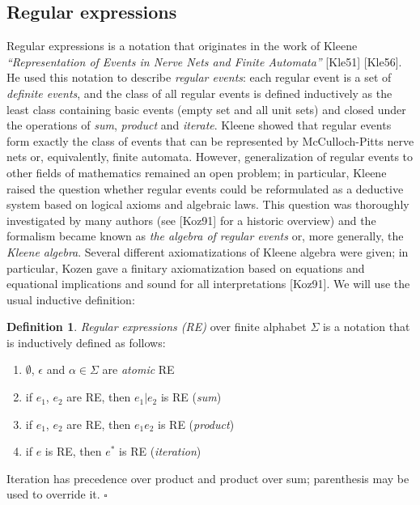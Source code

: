 \documentclass{article}
\newcommand{\Xin}{\!\in\!}
\newcommand{\Xeq}{\!=\!}
\theoremstyle{definition}
\newtheorem{Xdef}{Definition}
\begin{document}
\begin{multicols}{2}
\section{Regular expressions}\label{section_regular_expressions}

Regular expressions is a notation that originates in the work of Kleene
\emph{``Representation of Events in Nerve Nets and Finite Automata''} [Kle51] [Kle56].
He used this notation to describe \emph{regular events}:
each regular event is a set of \emph{definite events},
and the class of all regular events is defined inductively
as the least class containing basic events (empty set and all unit sets)
and closed under the operations of \emph{sum}, \emph{product} and \emph{iterate}.
Kleene showed that regular events form exactly the class of events that can be represented by McCulloch-Pitts nerve nets or, equivalently, finite automata.
However, generalization of regular events to other fields of mathematics remained an open problem;
in particular, Kleene raised the question whether regular events could be reformulated
as a deductive system based on logical axioms and algebraic laws.
This question was thoroughly investigated by many authors (see [Koz91] for a historic overview)
and the formalism became known as \emph{the algebra of regular events} %
or, more generally, the \emph{Kleene algebra}.
Several different axiomatizations of Kleene algebra were given;
in particular, Kozen gave a finitary axiomatization based on equations and equational implications and sound for all interpretations [Koz91].
We will use the usual inductive definition:
\\

    \begin{Xdef}
    \emph{Regular expressions (RE)} over finite alphabet $\Sigma$
    is a notation that is inductively defined as follows:
    \begin{enumerate}
        \medskip
        \item[] $\emptyset$, $\epsilon$ and $\alpha \Xin \Sigma$ are \emph{atomic} RE
        \item[] if $e_1$, $e_2$ are RE, then $e_1 | e_2$ is RE (\emph{sum})
        \item[] if $e_1$, $e_2$ are RE, then $e_1 e_2$ is RE (\emph{product})
        \item[] if $e$ is RE, then $e^*$ is RE (\emph{iteration})
        \medskip
    \end{enumerate}
    Iteration has precedence over product and product over sum;
    parenthesis may be used to override it.
    $\square$
    \end{Xdef}


\end{multicols}
\end{document}
